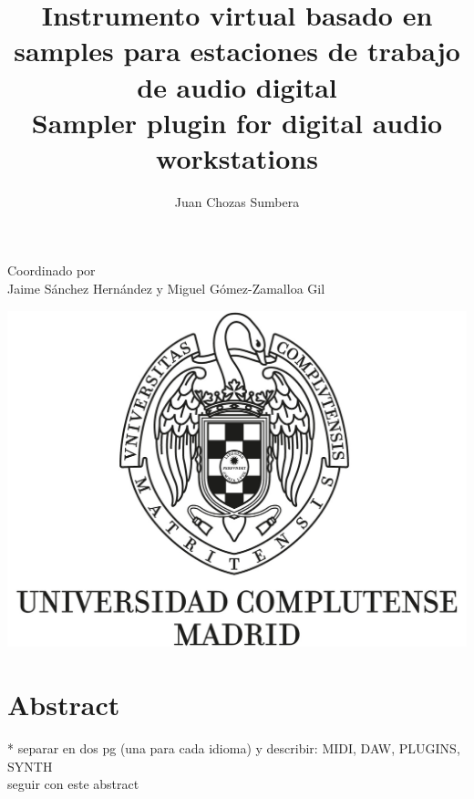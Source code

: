 \documentclass[12pt , a4paper]{article}
\title{Instrumento virtual basado en samples para estaciones de trabajo de audio digital\\Sampler plugin for digital audio workstations}
\author{Juan Chozas Sumbera}
\begin{document}
	\maketitle
	\begin{center}
		Coordinado por\\Jaime Sánchez Hernández y Miguel Gómez-Zamalloa Gil
		\newline
				
		\includegraphics[width=\textwidth]{logo_UCM.jpg}
	\end{center}

	
	
	\newpage
	\tableofcontents
	
	\newpage
	\section{Abstract}
	* separar en dos pg (una para cada idioma) y describir: MIDI, DAW, PLUGINS, SYNTH \\ seguir con este abstract
\end{document}
